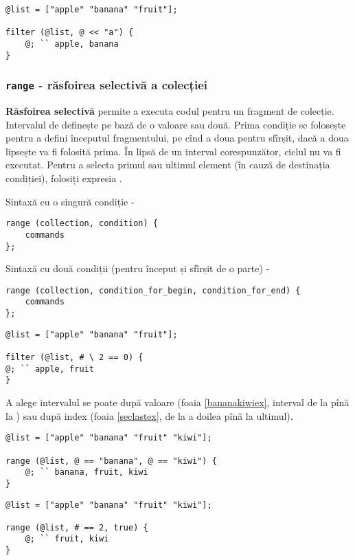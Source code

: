 \begin{lstlisting}[caption=Filtrare pe bază de valoare, label=filterdataex]
@list = ["apple" "banana" "fruit"];

filter (@list, @ << "a") {
	@; `` apple, banana
}
\end{lstlisting}

\subsubsection{\lstinline`range` - răsfoirea selectivă a colecției}

{\bf Răsfoirea selectivă} permite a executa codul pentru un fragment de colecție. Intervalul de definește pe bază de o valoare sau două. Prima condiție se folosește pentru a defini începutul fragmentului, pe cînd a doua pentru sfîrșit, dacă a doua lipsește va fi folosită prima. În lipsă de un interval corespunzător, ciclul nu va fi executat. Pentru a selecta primul sau ultimul element (în cauză de destinația condiției), folosiți expresia \true{}.

Sintaxă cu o singură condiție -
\begin{lstlisting}[numbers=none]
range (collection, condition) {
	commands
};
\end{lstlisting}

Sintaxă cu două condiții (pentru început și sfîrșit de o parte) -
\begin{lstlisting}[numbers=none]
range (collection, condition_for_begin, condition_for_end) {
	commands
};
\end{lstlisting}

\begin{lstlisting}[caption=Filtare după index, label=filterindexex]
@list = ["apple" "banana" "fruit"];

filter (@list, # \ 2 == 0) {
@; `` apple, fruit
}
\end{lstlisting}

A alege intervalul se poate după valoare (foaia \ref{bananakiwiex}, interval de la  pînă la ) sau după index (foaia \ref{seclastex}, de la a doilea pînă la ultimul).

\begin{lstlisting}[caption=Interval: de la banana pîna la kiwi, label=bananakiwiex]
@list = ["apple" "banana" "fruit" "kiwi"];

range (@list, @ == "banana", @ == "kiwi") {
	@; `` banana, fruit, kiwi
}
\end{lstlisting}

\begin{lstlisting}[caption=Interval: de la al doilea pînă la ultimul, label=seclastex]
@list = ["apple" "banana" "fruit" "kiwi"];

range (@list, # == 2, true) {
	@; `` fruit, kiwi
}
\end{lstlisting}

